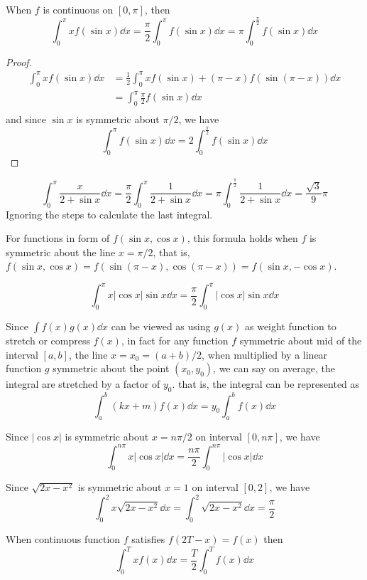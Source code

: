 \documentclass{overview}
\begin{document}
\begin{theorem}[Inference 2]
When $f$ is continuous on $[0, \pi]$, then
 \[
	 \int_0^{\pi} x f(\sin x) \dd x 
	 =\frac{\pi}{2} \int_0^{\pi} f(\sin x) \dd x
	 =\pi \int_0^{\frac{\pi}{2}} f(\sin x) \dd x
\] 
\begin{proof}
	\[
		\begin{aligned}
		\int_0^{\pi} x f(\sin x) \dd x
		&= \frac{1}{2}\int_0^{\pi} x f(\sin x) + (\pi - x) f(\sin(\pi - x)) \dd x \\
		&= \int_0^{\pi} \frac{\pi}{2} f(\sin x) \dd x \\
		\end{aligned}
	\]
	and since $\sin x$ is symmetric about $\pi/2$, we have
	\[
		\int_0^{\pi} f(\sin x) \dd x = 2 \int_0^{\frac{\pi}{2}} f(\sin x) \dd x
	\]
\end{proof}

\begin{example}
	\[
		\int_0^{\pi} \frac{x}{2+\sin x} \dd x = \frac{\pi}{2} \int_0^{\pi} \frac{1}{2+\sin x} \dd x
		= \pi \int_0^{\frac{\pi}{2}} \frac{1}{2+\sin x} \dd x
		= \frac{\sqrt3}{9} \pi
	\]
	Ignoring the steps to calculate the last integral.
\end{example}

For functions in form of $f(\sin x, \cos x)$, this formula holds when $f$ is symmetric
about the line $x=\pi/2$, that is, $f(\sin x, \cos x) = f(\sin(\pi - x), \cos(\pi - x))
= f(\sin x, -\cos x)$.
\begin{example}
	\[
		\int_0^{\pi} x |\cos x| \sin x \dd x = \frac{\pi}{2} \int_0^{\pi} |\cos x| \sin x \dd x
	\] 
\end{example}
\end{theorem}


Since $\int f(x)g(x) \dd x$ can be viewed as using $g(x)$ as weight function
to stretch or compress $f(x)$, in fact for any function $f$ symmetric about mid
of the interval $[a, b]$, the line $x=x_0=(a+b) / 2$, when multiplied by a
linear function $g$ symmetric about the point $(x_0, y_0)$, we can say on average,
the integral are stretched by a factor of $y_0$.
that is, the integral can be represented as
\[
	\int_a^b (kx+m)f(x) \dd x = y_0 \int_a^b f(x) \dd x
\]

\begin{example}
	Since $|\cos x|$ is symmetric about $x=n\pi/2$ on interval $[0, n\pi]$, we have
	\[
		\int_0^{n\pi} x |\cos x| \dd x = \frac{n\pi}{2} \int_0^{n\pi} |\cos x| \dd x
	\] 
\end{example}
\begin{example}
	Since $\sqrt{2x - x^2}$ is symmetric about $x=1$ on interval $[0, 2]$, we have
	\[
		\int_0^{2} x\sqrt{2x-x^2} \dd x
		= \int_0^{2} \sqrt{2x-x^2} \dd x
		= \frac{\pi}{2}
	\] 
\end{example}
\begin{theorem}
	When continuous function $f$ satisfies $f(2T-x) = f(x)$ then
	\[
		\int_0^T x f(x) \dd x = \frac{T}{2} \int_0^T f(x) \dd x
	\] 
\end{theorem}
\end{document}
